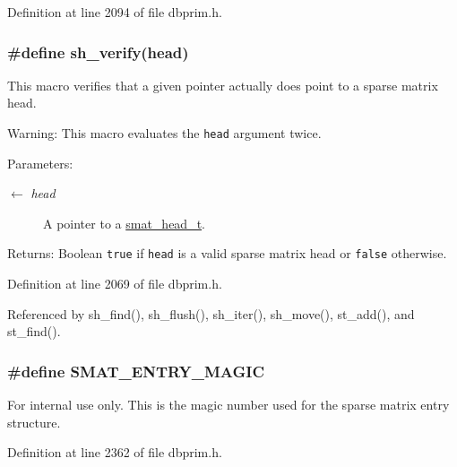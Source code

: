 Definition at line 2094 of file dbprim.h.\hypertarget{group__dbprim__smat_ga43}{
\subsubsection[sh\_\-verify]{\setlength{\rightskip}{0pt plus 5cm}\#define sh\_\-verify(head)}}
\label{group__dbprim__smat_ga43}


This macro verifies that a given pointer actually does point to a sparse matrix head.

\begin{Desc}
\item[Warning:]This macro evaluates the {\tt head} argument twice.\end{Desc}
\begin{Desc}
\item[Parameters:]
\begin{description}
\item[\mbox{$\leftarrow$} {\em head}]A pointer to a \hyperlink{group__dbprim__smat_ga1}{smat\_\-head\_\-t}.\end{description}
\end{Desc}
\begin{Desc}
\item[Returns:]Boolean {\tt true} if {\tt head} is a valid sparse matrix head or {\tt false} otherwise.\end{Desc}


Definition at line 2069 of file dbprim.h.

Referenced by sh\_\-find(), sh\_\-flush(), sh\_\-iter(), sh\_\-move(), st\_\-add(), and st\_\-find().\hypertarget{group__dbprim__smat_ga54}{
\subsubsection[SMAT\_\-ENTRY\_\-MAGIC]{\setlength{\rightskip}{0pt plus 5cm}\#define SMAT\_\-ENTRY\_\-MAGIC}}
\label{group__dbprim__smat_ga54}


\begin{Desc}
\item[For internal use only.]
This is the magic number used for the sparse matrix entry structure.\end{Desc}


Definition at line 2362 of file dbprim.h.

